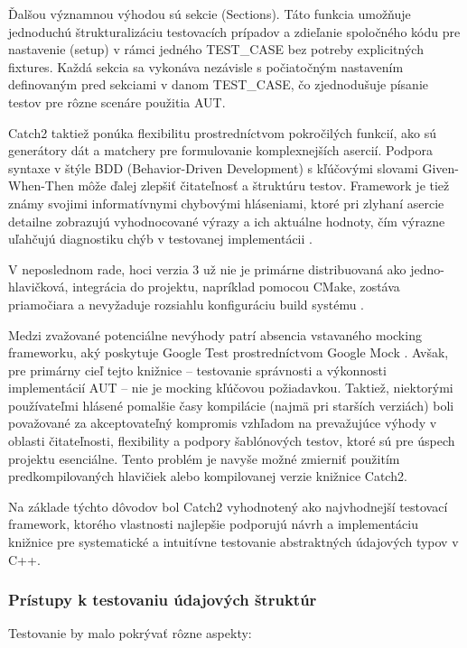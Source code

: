 \documentclass[11pt]{article}
\begin{document}
Ďalšou významnou výhodou sú sekcie (Sections). Táto funkcia umožňuje jednoduchú štrukturalizáciu testovacích prípadov a zdieľanie spoločného kódu pre nastavenie (setup) v rámci jedného TEST\_CASE bez potreby explicitných fixtures. Každá sekcia sa vykonáva nezávisle s počiatočným nastavením definovaným pred sekciami v danom TEST\_CASE, čo zjednodušuje písanie testov pre rôzne scenáre použitia AUT.

Catch2 taktiež ponúka flexibilitu prostredníctvom pokročilých funkcií, ako sú generátory dát a matchery pre formulovanie komplexnejších asercií. Podpora syntaxe v štýle BDD (Behavior-Driven Development) s kľúčovými slovami Given-When-Then môže ďalej zlepšiť čitateľnosť a štruktúru testov. Framework je tiež známy svojimi informatívnymi chybovými hláseniami, ktoré pri zlyhaní asercie detailne zobrazujú vyhodnocované výrazy a ich aktuálne hodnoty, čím výrazne uľahčujú diagnostiku chýb v testovanej implementácii \cite{github_catch2}.

V neposlednom rade, hoci verzia 3 už nie je primárne distribuovaná ako jedno-hlavičková, integrácia do projektu, napríklad pomocou CMake, zostáva priamočiara a nevyžaduje rozsiahlu konfiguráciu build systému \cite{github_catch2}.

Medzi zvažované potenciálne nevýhody patrí absencia vstavaného mocking frameworku, aký poskytuje Google Test prostredníctvom Google Mock \cite{github_catch2}. Avšak, pre primárny cieľ tejto knižnice -- testovanie správnosti a výkonnosti implementácií AUT -- nie je mocking kľúčovou požiadavkou. Taktiež, niektorými používateľmi hlásené pomalšie časy kompilácie (najmä pri starších verziách) boli považované za akceptovateľný kompromis vzhľadom na prevažujúce výhody v oblasti čitateľnosti, flexibility a podpory šablónových testov, ktoré sú pre úspech projektu esenciálne. Tento problém je navyše možné zmierniť použitím predkompilovaných hlavičiek alebo kompilovanej verzie knižnice Catch2.

Na základe týchto dôvodov bol Catch2 vyhodnotený ako najvhodnejší testovací framework, ktorého vlastnosti najlepšie podporujú návrh a implementáciu knižnice pre systematické a intuitívne testovanie abstraktných údajových typov v C++.

\subsubsection{Prístupy k testovaniu údajových štruktúr}

Testovanie by malo pokrývať rôzne aspekty:
\end{document}
